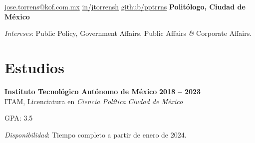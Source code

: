 \documentclass[letter]{resume}
\begin{document}
\begin{center}
{\href{mailto://jose.torrens@kof.com.mx}{jose.torrens@kof.com.mx}}
{\href{https://www.linkedin.com/in/jtorrensh/}{in/jtorrensh}}
{\href{https://github.com/pptrrns}{github/pptrrns}}
{\bf Politólogo, Ciudad de México}

\emph{Intereses}: {Public Policy, Government Affairs, Public Affairs {\em\&} Corporate Affairs.}
\end{center}

\section{Estudios}
\begin{content}
{\bf Instituto Tecnológico Autónomo de México} \emph {} \hfill {\bf 2018 -- 2023} \\ 
{ITAM, Licenciatura en \emph{Ciencia Política}} \hfill \emph {Ciudad de México}

GPA: 3.5

\emph{Disponibilidad}: {Tiempo completo a partir de enero de 2024.}

\sectionlineskip
\end{content}

\end{document}
